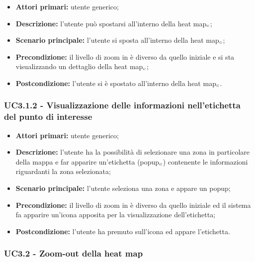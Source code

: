 \begin{itemize}
	\item \textbf{Attori primari:} utente generico;
	\item \textbf{Descrizione:} l’utente può spostarsi all’interno della heat map$_{\scaleto{G}{3pt}}$;
	\item \textbf{Scenario principale:} l’utente si sposta all’interno della heat map$_{\scaleto{G}{3pt}}$;
	\item \textbf{Precondizione:} il livello di zoom in è diverso da quello iniziale e si sta visualizzando un dettaglio della heat map$_{\scaleto{G}{3pt}}$;
	\item \textbf{Postcondizione:} l’utente si è spostato all’interno della heat map$_{\scaleto{G}{3pt}}$.
\end{itemize}

\subsubsection{UC3.1.2 - Visualizzazione delle informazioni nell'etichetta del punto di interesse}\label{CasiDUsoCasiDUsoTraUnUtenteEIlFrontEndElencoCasiDUsoUC312VisualizzazioneDelPopupDiUnPuntoDiInteresse}

\begin{itemize}
	\item \textbf{Attori primari:} utente generico;
	\item \textbf{Descrizione:} l’utente ha la possibilità di selezionare una zona in particolare della mappa e far apparire un'etichetta (popup$_{\scaleto{G}{3pt}}$) contenente le informazioni riguardanti la zona selezionata;
	\item \textbf{Scenario principale:} l’utente seleziona una zona e appare un popup;
	\item \textbf{Precondizione:} il livello di zoom in è diverso da quello iniziale ed il sistema fa apparire un’icona apposita per la visualizzazione dell'etichetta;
	\item \textbf{Postcondizione:} l’utente ha premuto sull’icona ed appare l'etichetta.
\end{itemize}

\subsubsection{UC3.2 - Zoom-out della heat map}\label{CasiDUsoCasiDUsoTraUnUtenteEIlFrontEndElencoCasiDUsoUC32ZoomOutDellaHeatMap}

